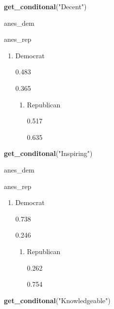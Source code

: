 \documentclass[
]{article}
\newenvironment{Shaded}{\begin{snugshade}}{\end{snugshade}}
\newcommand{\KeywordTok}[1]{\textcolor[rgb]{0.13,0.29,0.53}{\textbf{#1}}}
\newcommand{\NormalTok}[1]{#1}
\newcommand{\StringTok}[1]{\textcolor[rgb]{0.31,0.60,0.02}{#1}}
\providecommand{\tightlist}{%
  \setlength{\itemsep}{0pt}\setlength{\parskip}{0pt}}
\begin{document}
\begin{Shaded}
\begin{Highlighting}[]
\KeywordTok{get_conditonal}\NormalTok{(}\StringTok{"Decent"}\NormalTok{)}
\end{Highlighting}
\end{Shaded}

anes\_dem

anes\_rep

\begin{enumerate}
\def\labelenumi{\arabic{enumi}.}
\tightlist
\item
  Democrat

  {0.483}

  {0.365}

  \begin{enumerate}
  \def\labelenumii{\arabic{enumii}.}
  \setcounter{enumii}{1}
  \tightlist
  \item
    Republican

    {0.517}

    {0.635}
  \end{enumerate}
\end{enumerate}

\begin{Shaded}
\begin{Highlighting}[]
\KeywordTok{get_conditonal}\NormalTok{(}\StringTok{"Inspiring"}\NormalTok{)}
\end{Highlighting}
\end{Shaded}

anes\_dem

anes\_rep

\begin{enumerate}
\def\labelenumi{\arabic{enumi}.}
\tightlist
\item
  Democrat

  {0.738}

  {0.246}

  \begin{enumerate}
  \def\labelenumii{\arabic{enumii}.}
  \setcounter{enumii}{1}
  \tightlist
  \item
    Republican

    {0.262}

    {0.754}
  \end{enumerate}
\end{enumerate}

\begin{Shaded}
\begin{Highlighting}[]
\KeywordTok{get_conditonal}\NormalTok{(}\StringTok{"Knowledgeable"}\NormalTok{)}
\end{Highlighting}
\end{Shaded}
\end{document}
